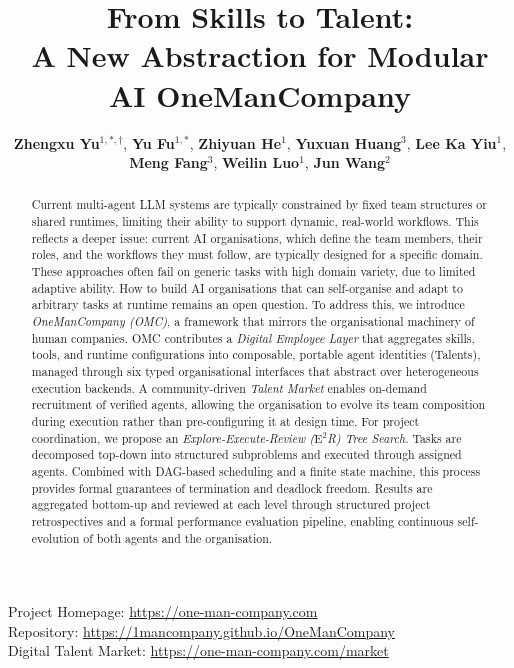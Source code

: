 \documentclass[11pt,a4paper]{article}
\title{\bfseries\color{titleRed}
From Skills to Talent: \\[2pt]
A New Abstraction for Modular AI OneManCompany}
\author{
\textbf{Zhengxu Yu}$^{1,*,\dagger}$,
\textbf{Yu Fu}$^{1,*}$,
\textbf{Zhiyuan He}$^{1}$,
\textbf{Yuxuan Huang}$^{3}$,
\textbf{Lee Ka Yiu}$^{1}$,\\
\textbf{Meng Fang}$^{3}$,
\textbf{Weilin Luo}$^{1}$,
\textbf{Jun Wang}$^{2}$
}
\date{}
\begin{document}
\vspace{-3.2cm}
\maketitle
\thispagestyle{empty}
\vspace{-1.6em}

\begin{center}
Project Homepage: \url{https://one-man-company.com} \\
Repository: \url{https://1mancompany.github.io/OneManCompany}\\
Digital Talent Market: \url{https://one-man-company.com/market}
\end{center}

\begin{abstract}
Current multi-agent LLM systems are typically constrained by fixed team structures or shared runtimes, limiting their ability to support dynamic, real-world workflows.  This reflects a deeper issue: current AI organisations, which define the team members, their roles, and the workflows they must follow, are typically designed for a specific domain.  These approaches often fail on generic tasks with high domain variety, due to limited adaptive ability.  How to build AI organisations that can self-organise and adapt to arbitrary tasks at runtime remains an open question.  To address this, we introduce \emph{OneManCompany (OMC)}, a framework that mirrors the organisational machinery of human companies.  OMC contributes a \emph{Digital Employee Layer} that aggregates skills, tools, and runtime configurations into composable, portable agent identities (Talents), managed through six typed organisational interfaces that abstract over heterogeneous execution backends.  A community-driven \emph{Talent Market} enables on-demand recruitment of verified agents, allowing the organisation to evolve its team composition during execution rather than pre-configuring it at design time.
For project coordination, we propose an \emph{Explore-Execute-Review ($\text{E}^2$R) Tree Search}. Tasks are decomposed top-down into structured subproblems and executed through assigned agents. Combined with DAG-based scheduling and a finite state machine, this process provides formal guarantees of termination and deadlock freedom. Results are aggregated bottom-up and reviewed at each level through structured project retrospectives and a formal performance evaluation pipeline, enabling continuous self-evolution of both agents and the organisation.

\end{abstract}
\end{document}
